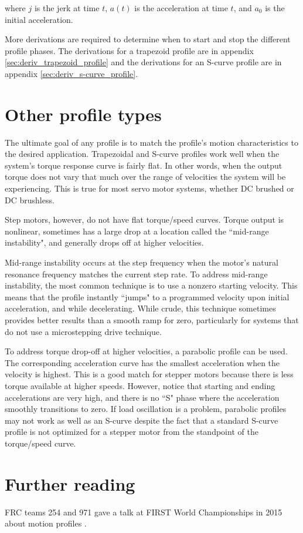where $j$ is the jerk at time $t$, $a(t)$ is the acceleration at time $t$, and
$a_0$ is the initial acceleration.

More derivations are required to determine when to start and stop the different
profile phases. The derivations for a trapezoid profile are in appendix
\ref{sec:deriv_trapezoid_profile} and the derivations for an S-curve profile are
in appendix \ref{sec:deriv_s-curve_profile}.

\section{Other profile types}

The ultimate goal of any profile is to match the profile's motion
characteristics to the desired application. Trapezoidal and S-curve profiles
work well when the \gls{system}'s torque response curve is fairly flat. In other
words, when the output torque does not vary that much over the range of
velocities the \gls{system} will be experiencing. This is true for most servo
motor systems, whether DC brushed or DC brushless.

Step motors, however, do not have flat torque/speed curves. Torque output is
nonlinear, sometimes has a large drop at a location called the ``mid-range
instability", and generally drops off at higher velocities.

Mid-range instability occurs at the step frequency when the motor's natural
resonance frequency matches the current step rate. To address mid-range
instability, the most common technique is to use a nonzero starting velocity.
This means that the profile instantly ``jumps" to a programmed velocity upon
initial acceleration, and while decelerating. While crude, this technique
sometimes provides better results than a smooth ramp for zero, particularly for
\glspl{system} that do not use a microstepping drive technique.

To address torque drop-off at higher velocities, a parabolic profile can be
used. The corresponding acceleration curve has the smallest acceleration when
the velocity is highest. This is a good match for stepper motors because there
is less torque available at higher speeds. However, notice that starting and
ending accelerations are very high, and there is no ``S" phase where the
acceleration smoothly transitions to zero. If load oscillation is a problem,
parabolic profiles may not work as well as an S-curve despite the fact that a
standard S-curve profile is not optimized for a stepper motor from the
standpoint of the torque/speed curve.

\section{Further reading}

FRC teams 254 and 971 gave a talk at FIRST World Championships in 2015 about
motion profiles \cite{bib:motion_profiles}.
